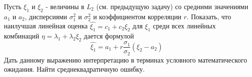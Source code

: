 \begin{problem}
Пусть  $\xi_1$ и  $\xi_2$ - величины в $L_2$ (см. предыдущую задачу) со средними значениями $a_1$ и $a_2$, дисперсиями $\sigma_1^2$ и $\sigma_2^2$ 
и коэффициентом корреляции $r$. Показать, что наилучшая линейная оценка 
$\widehat{\xi_1}  = c_1 + c_2 \xi_2$ для $\xi_1$ среди всех линейных комбинаций $\eta  = \lambda_1 + \lambda_2 \xi_2$  дается формулой 
\[
\widehat{\xi_1}  = a_1 + r \frac{\sigma_1}{\sigma_2} (\xi_2 - a_2)
\]
Дать данному выражению интерпретацию в терминах условного математического ожидания. Найти среднеквадратичную ошибку.
\end{problem}


\begin{comment}
\begin{problem}
Предположим, что с.в. $X\in L_2$, это означает ${\mathbb E}X^2<\infty$. Докажите, что 
\begin{equation}
\label{UMO}
\| X-{\mathbb E}(X|Y_1,\ldots,Y_n)\|_{L_2}=\min\limits_{\varphi\in H} \| X-\varphi(Y_1,\ldots,Y_n)\|_{L_2} , 
\end{equation}
где $H$ --- подпространство пространства $L_2$ всевозможных борелевских функций $\varphi(Y_1,\ldots,Y_n)\in L_2$; 
${\mathbb E}(X|Y_1,\ldots,Y_n)$ --- условное математическое ожидание с.в. $X$ относительно $\sigma$-алгебры, порожденной с.в. 
$Y_1,\ldots,Y_n$, часто говорят просто относительно с.в. $Y_1,\ldots,Y_n$; 
$$
\| X\|_{L_2}=\sqrt{\langle X,X\rangle_{L_2}}=\sqrt{{\mathbb E}(X\cdot X)}=\sqrt{{\mathbb E}(X^2)} . 
$$
\end{problem}

\begin{ordre}
Покажите, что $X-{\mathbb E}^{\mathcal A}X \bot \xi,\quad \forall\xi\in H$, т.е. ${\mathbb E}^{\mathcal A}$ 
является проектором на подпространство $H$ в $L_2$. 
\end{ordre}


\begin{problem}
Докажите, что если в условиях предыдущей задачи $(X,Y_1,\ldots,Y_n)^T$ --- является нормальным случайным вектором (без ограничения 
общности можно также считать, что $(Y_1,\ldots,Y_n)^T$  --- невырожденный нормальный случайный вектор), то в качестве $H$ можно взять 
подпространство всевозможных линейных комбинаций с.в. $Y_1,\ldots,Y_n$. Т.е. мы можем более конкретно сказать, на каком именно 
классе борелевских функций достигается минимум в $(\ref{UMO})$. 
\end{problem}

\begin{ordre}
Будем искать 
${\mathbb E}(X|Y_1,\ldots,Y_n)$ в виде 
\begin{equation}
\label{Gauss}
{\mathbb E}(X|Y_1,\ldots,Y_n)=c_1 Y_1+\ldots +c_n Y_n . 
\end{equation}


\end{comment}
